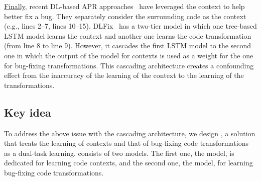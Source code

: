\underline{Finally}, recent DL-based APR
approaches~\cite{icse20,cure-icse21} have leveraged the context to
help better fix a bug. They separately consider the surrounding code
as the context (e.g., lines 2--7, lines 10--15). DLFix~\cite{icse20}
has a two-tier model in which one tree-based LSTM model learns the
context and another one learns the code transformation (from line 8 to
line 9). However, it cascades the first LSTM model to the second one
in which the output of the model for contexts is used as a weight for
the one for bug-fixing transformations. This cascading architecture
creates a confounding effect from the inaccuracy of the learning
of the context to the learning of the transformations.

\subsection{Key idea}
\label{sec:key-idea}

To address the above issue with the cascading architecture, we design
{\tool}, a solution that treats the learning of contexts and that of
bug-fixing code transformations as a dual-task learning. {\tool}
consists of two models. The first one, the  model, is
dedicated for learning code contexts, and the second one, the
 model, for learning bug-fixing code transformations.



